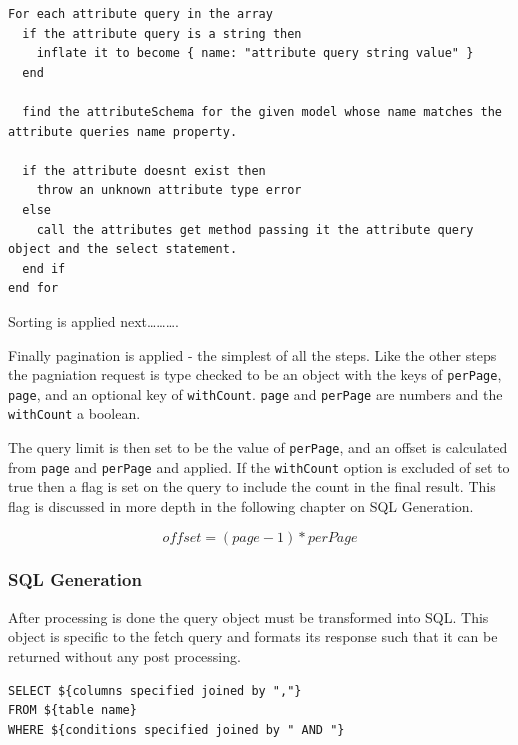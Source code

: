 \documentclass[
  12pt,
]{article}
\newcommand{\passthrough}[1]{#1}
\begin{document}
\begin{lstlisting}[caption={The algorithm used to parse the attributes part of a fetch query}]
For each attribute query in the array
  if the attribute query is a string then
    inflate it to become { name: "attribute query string value" }
  end

  find the attributeSchema for the given model whose name matches the attribute queries name property.

  if the attribute doesnt exist then
    throw an unknown attribute type error
  else
    call the attributes get method passing it the attribute query object and the select statement.
  end if
end for
\end{lstlisting}

Sorting is applied next\ldots\ldots\ldots.

Finally pagination is applied - the simplest of all the steps. Like the
other steps the pagniation request is type checked to be an object with
the keys of \passthrough{\lstinline!perPage!},
\passthrough{\lstinline!page!}, and an optional key of
\passthrough{\lstinline!withCount!}. \passthrough{\lstinline!page!} and
\passthrough{\lstinline!perPage!} are numbers and the
\passthrough{\lstinline!withCount!} a boolean.

The query limit is then set to be the value of
\passthrough{\lstinline!perPage!}, and an offset is calculated from
\passthrough{\lstinline!page!} and \passthrough{\lstinline!perPage!} and
applied. If the \passthrough{\lstinline!withCount!} option is excluded
of set to true then a flag is set on the query to include the count in
the final result. This flag is discussed in more depth in the following
chapter on SQL Generation.

\[ offset = (page - 1) * perPage \]

\hypertarget{sql-generation}{%
\subsubsection{SQL Generation}\label{sql-generation}}

After processing is done the query object must be transformed into SQL.
This object is specific to the fetch query and formats its response such
that it can be returned without any post processing.

\begin{lstlisting}[caption={Example logic within the SqlQuery to create the final query}]
SELECT ${columns specified joined by ","}
FROM ${table name}
WHERE ${conditions specified joined by " AND "}
\end{lstlisting}
\end{document}
